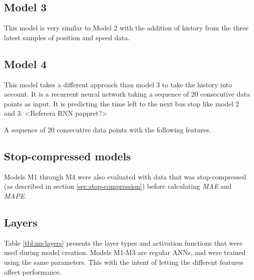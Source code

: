 \subsection{Model 3}\label{M3}
This model is very similar to Model 2 with the addition of history from the three latest samples of position and speed data.

\subsection{Model 4}
This model takes a different approach than model 3 to take the history into account. It is a recurrent neural network taking a sequence of 20 consecutive data points as input. It is predicting the time left to the next bus stop like model 2 and 3. 
<Referera RNN pappret?>

A sequence of 20 consecutive data points with the following features. 

\subsection{Stop-compressed models}
Models M1 through M4 were also evaluated with data that was stop-compressed (as described in section \ref{sec:stop-compression}) before calculating \textit{MAE} and \textit{MAPE}. 

\subsection{Layers}
Table \ref{tbl:nn-layers} presents the layer types and activation functions that were used during model creation. Models M1-M3 are regular ANNs, and were trained using the same parameters. This with the intent of letting the different features affect performance.

